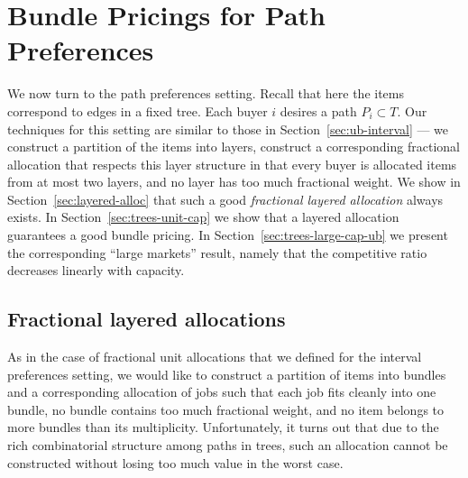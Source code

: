 \section{Bundle Pricings for Path Preferences}
\label{sec:trees-ub}

We now turn to the path preferences setting. Recall that here the
items correspond to edges in a fixed tree. Each buyer $i$ desires a
path $P_i\subset T$. Our techniques for this setting are similar to
those in Section~\ref{sec:ub-interval} --- we construct a partition of
the items into layers, construct a corresponding fractional allocation
that respects this layer structure in that every buyer is allocated
items from at most two layers, and no layer has too much fractional
weight. We show in Section~\ref{sec:layered-alloc} that such a good
{\em fractional layered allocation} always exists. In
Section~\ref{sec:trees-unit-cap} we show that a layered allocation
guarantees a good bundle pricing. In
Section~\ref{sec:trees-large-cap-ub} we present the corresponding
``large markets'' result, namely that the competitive ratio decreases
linearly with capacity.

\subsection{Fractional layered allocations}
\label{sec:ub-tree-layered}


As in the case of fractional unit allocations that we defined for the interval
preferences setting, we would like to construct a partition of items into
bundles and a corresponding allocation of jobs such that each job fits cleanly
into one bundle, no bundle contains too much fractional weight, and no item
belongs to more bundles than its multiplicity. Unfortunately, it turns out that
due to the rich combinatorial structure among paths in trees, such an
allocation cannot be constructed without losing too much value in the worst
case.

